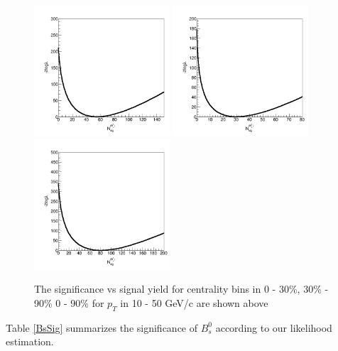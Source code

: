 \begin{figure}[h]
\begin{center}
\includegraphics[width= 0.45\textwidth]{Figures/Chapter5/sigscan_0_30_10_50.png}
\includegraphics[width= 0.45\textwidth]{Figures/Chapter5/sigscan_30_90_10_50.png}
\includegraphics[width= 0.45\textwidth]{Figures/Chapter5/sigscan_0_90_10_50.png}
\caption{The significance vs signal yield for centrality bins in 0 - 30\%, 30\% - 90\% 0 - 90\% for $p_T$ in 10 - 50 GeV/c are shown above}
\label{fig:SigScanCent}
\end{center}
\end{figure}



Table \ref{BsSig} summarizes the significance of $B^0_s$ according to our likelihood estimation.



